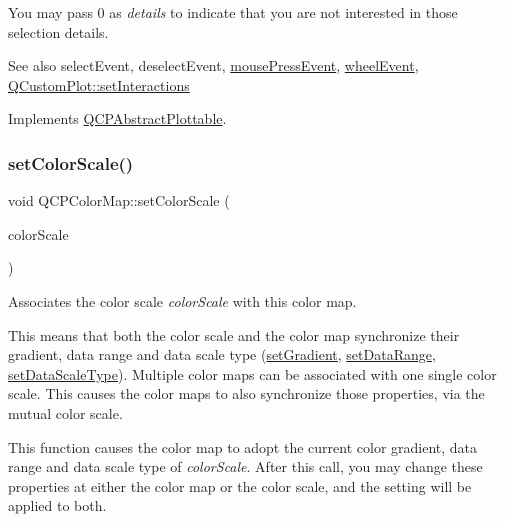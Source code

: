 You may pass 0 as {\itshape details} to indicate that you are not interested in those selection details.

\begin{DoxySeeAlso}{See also}
select\+Event, deselect\+Event, \hyperlink{class_q_c_p_layerable_af6567604818db90f4fd52822f8bc8376}{mouse\+Press\+Event}, \hyperlink{class_q_c_p_layerable_a47dfd7b8fd99c08ca54e09c362b6f022}{wheel\+Event}, \hyperlink{class_q_custom_plot_a5ee1e2f6ae27419deca53e75907c27e5}{Q\+Custom\+Plot\+::set\+Interactions} 
\end{DoxySeeAlso}


Implements \hyperlink{class_q_c_p_abstract_plottable_a38efe9641d972992a3d44204bc80ec1d}{Q\+C\+P\+Abstract\+Plottable}.

\mbox{\label{class_q_c_p_color_map_aa828921db364fe3c6af4619580ab85fd}} 
\subsubsection{\texorpdfstring{set\+Color\+Scale()}{setColorScale()}}
{\footnotesize\ttfamily void Q\+C\+P\+Color\+Map\+::set\+Color\+Scale (\begin{DoxyParamCaption}\item[{\hyperlink{class_q_c_p_color_scale}{Q\+C\+P\+Color\+Scale} $\ast$}]{color\+Scale }\end{DoxyParamCaption})}

Associates the color scale {\itshape color\+Scale} with this color map.

This means that both the color scale and the color map synchronize their gradient, data range and data scale type (\hyperlink{class_q_c_p_color_map_a7313c78360471cead3576341a2c50377}{set\+Gradient}, \hyperlink{class_q_c_p_color_map_a980b42837821159786a85b4b7dcb8774}{set\+Data\+Range}, \hyperlink{class_q_c_p_color_map_a9d20aa08e3c1f20f22908c45b9c06511}{set\+Data\+Scale\+Type}). Multiple color maps can be associated with one single color scale. This causes the color maps to also synchronize those properties, via the mutual color scale.

This function causes the color map to adopt the current color gradient, data range and data scale type of {\itshape color\+Scale}. After this call, you may change these properties at either the color map or the color scale, and the setting will be applied to both.

